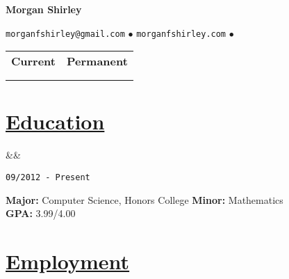 \documentclass[11pt]{article}
\newcommand{\heading}[1]{
    \section*{\uline{\hfill #1}}
}
\newcommand{\squish}{
    \setlength{\itemsep}{0pt}
    \setlength{\parskip}{0pt}
    \setlength{\parsep}{0pt}
}
\newcommand{\when}[1]{
    \hfill \texttt{#1}%
}
\newcommand{\experience}[3]{
    \ifx&#2&
        \item[{#1}]
    \else
        \item[{#1}, \emph{#2}]
    \fi
    \when{#3}%
}
\newcommand{\contact}[7]{
    \centerline{
        \large       
        \texttt{#1}
        $\bullet$
        \texttt{#2}
        $\bullet$
        \texttt{#3}
    }
    
    \begin{center}
    	\scriptsize
    	\begin{tabular}{l l}
    	\textbf{Current} & \textbf{Permanent} \\
        {#4} & {#6} \\
        {#5} & {#7}
        
        \end{tabular}
    \end{center}
}
\begin{document}
\centerline{{\Huge \bf Morgan Shirley}}
\bigskip

\contact{morganfshirley@gmail.com}
        {morganfshirley.com}
        {\phone}
        {\currentaddr}{\currentcity}
        {\permanentaddr}{\permanentcity}
        
\heading{Education}%

\begin{description}
	\squish
	\experience{Oregon State University, Corvallis, OR}
	{}
	{09/2012 - Present}
	
	\textbf{Major:} Computer Science, Honors College \textbf{Minor:} Mathematics \\
	\textbf{GPA:} 3.99/4.00
	
\end{description}

\heading{Employment}%
\end{document}

